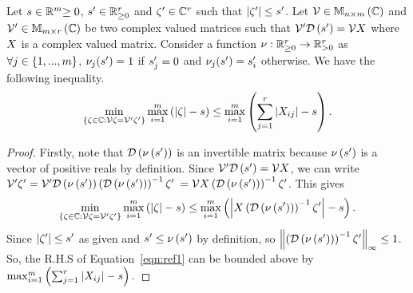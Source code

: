 \begin{lemma}
Let $s\in\mathbb{R}^m{\geq 0}$, $s^\prime\in\mathbb{R}^r_{\geq 0}$ and
$\zeta^\prime\in\mathbb{C}^r$ such that
$\left|\zeta^\prime\right|\leq s^\prime$.  Let
$\mathcal{V}\in\mathbb{M}_{n\times m}\left(\mathbb{C}\right)$ and
$\mathcal{V}^\prime\in\mathbb{M}_{m\times r}\left(\mathbb{C}\right)$ be two complex valued matrices
such that $\mathcal{V}^\prime\mathcal{D}\left(s^\prime\right)=\mathcal{V}X$ where $X$
is a complex valued matrix.  Consider a function
$\nu:\mathbb{R}_{\geq 0}^r\rightarrow \mathbb{R}_{>0}^r$ as $\forall
j\in\left\{1,...,m\right\}$, $\nu_j(s^\prime)=1$ if $s^\prime_j=0$ and
$\nu_j(s^\prime)=s^\prime_i$ otherwise.  We have the following
inequality.
\begin{equation}\label{eqn:transfer-matrix}
\min_{\left\{\zeta\in\mathbb{C}:\mathcal{V}\zeta=\mathcal{V}^\prime\zeta^\prime\right\}}\max_{i=1}^m\left(\left|\zeta\right|-s\right)\leq \max_{i=1}^m\left(\sum_{j=1}^r\left|X_{ij}\right|-s\right).
\end{equation}
\end{lemma}
\begin{proof}
Firstly, note that $\mathcal{D}\left(\nu\left(s^\prime\right)\right)$ is an invertible
matrix because $\nu\left(s^\prime\right)$ is a vector of positive reals by
definition.  Since $\mathcal{V}^\prime\mathcal{D}\left(s^\prime\right)=\mathcal{V}X$, we
can write $\mathcal{V}^\prime\zeta^\prime
= \mathcal{V}^\prime\mathcal{D}\left(\nu\left(s^\prime\right)\right)\left(\mathcal{D}\left(\nu\left(s^\prime\right)\right)\right)^{-1}\zeta^\prime$
$=\mathcal{V}X\left(\mathcal{D}\left(\nu\left(s^\prime\right)\right)\right)^{-1}\zeta^\prime$.
This gives
\begin{equation}\label{eqn:ref1}
\min_{\left\{\zeta\in\mathbb{C}:\mathcal{V}\zeta=\mathcal{V}^\prime\zeta^\prime\right\}}\max_{i=1}^m\left(\left|\zeta\right|-s\right)\leq
\max_{i=1}^m\left(\left|X\left(\mathcal{D}\left(\nu\left(s^\prime\right)\right)\right)^{-1}\zeta^\prime\right|-s\right).
\end{equation}
Since $\left|\zeta^\prime\right|\leq s^\prime$ as given and
$s^\prime\leq \nu\left(s^\prime\right)$ by definition, so
$\left\|\left(\mathcal{D}\left(\nu\left(s^\prime\right)\right)\right)^{-1}\zeta^\prime\right\|_{\infty}\leq
1$.  So, the R.H.S of Equation~\ref{eqn:ref1} can be bounded above by
$
\max_{i=1}^m\left(\sum_{j=1}^r\left|X_{ij}\right|-s\right).
$
\end{proof}

